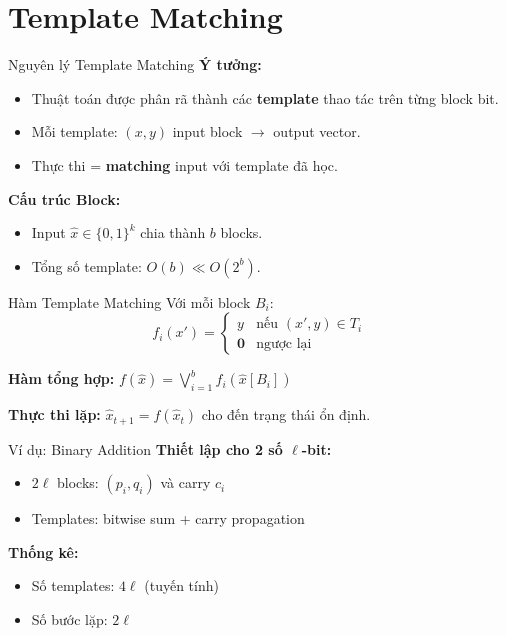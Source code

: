 
\section{Template Matching}

\begin{frame}{Nguyên lý Template Matching}
  \textbf{Ý tưởng:}
  \begin{itemize}
    \item Thuật toán được phân rã thành các \textbf{template} thao tác trên từng block bit.
    \item Mỗi template: $(x, y)$ input block $\to$ output vector.
    \item Thực thi = \textbf{matching} input với template đã học.
  \end{itemize}

  \vspace{0.3cm}
  \textbf{Cấu trúc Block:}
  \begin{itemize}
    \item Input $\hat{x} \in \{0,1\}^k$ chia thành $b$ blocks.
    \item Tổng số template: $O(b) \ll O(2^b)$.
  \end{itemize}
\end{frame}

\begin{frame}{Hàm Template Matching}
  Với mỗi block $B_i$:
  \[
    f_i(x') = \begin{cases} y & \text{nếu } (x', y) \in T_i \\ \mathbf{0} & \text{ngược lại} \end{cases}
  \]

  \textbf{Hàm tổng hợp:} $f(\hat{x}) = \bigvee_{i=1}^{b} f_i(\hat{x}[B_i])$
  
  \vspace{0.3cm}
  \textbf{Thực thi lặp:} $\hat{x}_{t+1} = f(\hat{x}_t)$ cho đến trạng thái ổn định.
\end{frame}

\begin{frame}{Ví dụ: Binary Addition}
  \textbf{Thiết lập cho 2 số $\ell$-bit:}
  \begin{itemize}
    \item $2\ell$ blocks: $(p_i, q_i)$ và carry $c_i$
    \item Templates: bitwise sum + carry propagation
  \end{itemize}

  \vspace{0.3cm}
  \textbf{Thống kê:}
  \begin{itemize}
    \item Số templates: $4\ell$ (tuyến tính)
    \item Số bước lặp: $2\ell$
  \end{itemize}
\end{frame}

